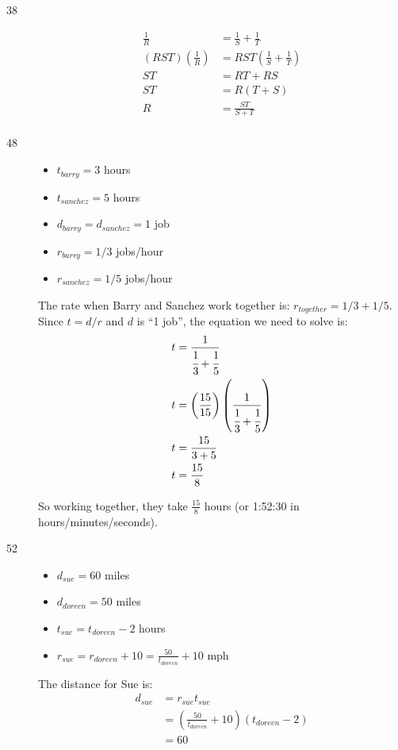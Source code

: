 \documentclass[fleqn,addpoints]{exam}
\begin{document}
\begin{description}
\item[38]
\begin{align*}
  \frac{1}{R} &= \frac{1}{S} + \frac{1}{T} \\
  (RST) \left( \frac{1}{R} \right) &= RST \left( \frac{1}{S} + \frac{1}{T} \right) \\
  ST &= RT + RS \\
  ST &= R(T + S) \\
  R &= \frac{ST}{S+T} \\
\end{align*}

\item[48]

\begin{itemize}
  \item $t_{barry} = 3$ hours
  \item $t_{sanchez} = 5$ hours
  \item $d_{barry} = d_{sanchez} = 1$ job
  \item $r_{barry} = 1/3$ jobs/hour
  \item $r_{sanchez} = 1/5$ jobs/hour
\end{itemize}

The rate when Barry and Sanchez work together is: $r_{together} = 1/3 + 1/5$.  Since $t=d/r$ and $d$ is ``1 job'', the
equation we need to solve is:
\begin{align*}
  t & = \frac{1}{\cfrac{1}{3} + \cfrac{1}{5}} \\
  t & = \left( \frac{15}{15} \right) \left( \frac{1}{\cfrac{1}{3} + \cfrac{1}{5}} \right) \\
  t & = \frac{15}{3 + 5} \\
  t & = \frac{15}{8} \\
\end{align*}

So working together, they take $\displaystyle \frac{15}{8}$ hours (or 1:52:30 in hours/minutes/seconds).

\item[52]

\begin{itemize}
  \item $d_{sue} = 60$ miles
  \item $d_{doreen} = 50$ miles
  \item $t_{sue} = t_{doreen} - 2$ hours
  \item $r_{sue} = r_{doreen} + 10 = \frac{50}{t_{doreen}} + 10$ mph
\end{itemize}


The distance for Sue is: 
\begin{align*}
  d_{sue} &= r_{sue}t_{sue} \\
  & = \left( \frac{50}{t_{doreen}} + 10 \right) (t_{doreen} - 2)  \\
  & = 60 \\
\end{align*}


\end{description}
\end{document}
